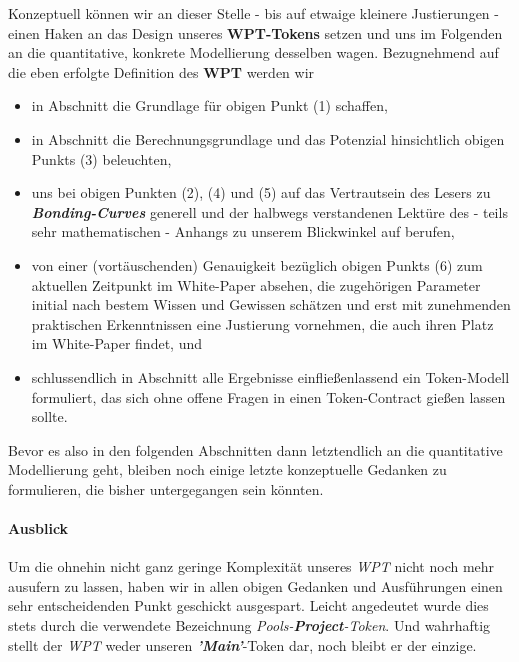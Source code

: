 \vspace{0.5cm}

Konzeptuell können wir an dieser Stelle - bis auf etwaige kleinere Justierungen - einen Haken an das Design unseres \textbf{WPT-Tokens} setzen und uns im Folgenden an die quantitative, konkrete Modellierung desselben wagen. Bezugnehmend auf die eben erfolgte Definition des \textbf{WPT} werden wir

\begin{itemize}
	\item in Abschnitt  die Grundlage für obigen Punkt (1) schaffen,
	\item in Abschnitt  die Berechnungsgrundlage und das Potenzial hinsichtlich obigen Punkts (3) beleuchten,
	\item uns bei obigen Punkten (2), (4) und (5) auf das Vertrautsein des Lesers zu \textbf{\textit{Bonding-Curves}} generell und der halbwegs verstandenen Lektüre des - teils sehr mathematischen - Anhangs zu unserem Blickwinkel auf  berufen,
	\item von einer (vortäuschenden) Genauigkeit bezüglich obigen Punkts (6) zum aktuellen Zeitpunkt im White-Paper absehen, die zugehörigen Parameter initial nach bestem Wissen und Gewissen schätzen und erst mit zunehmenden praktischen Erkenntnissen eine Justierung vornehmen, die auch ihren Platz im White-Paper findet, und
	\item schlussendlich in Abschnitt  alle Ergebnisse einfließenlassend ein Token-Modell formuliert, das sich ohne offene Fragen in einen Token-Contract gießen lassen sollte. 
\end{itemize}

\vspace{0.3cm}

Bevor es also in den folgenden Abschnitten dann letztendlich an die quantitative Modellierung geht, bleiben noch einige letzte konzeptuelle Gedanken zu formulieren, die bisher untergegangen sein könnten.

\vspace{0.5cm}


\paragraph{Ausblick}
\textbf{ }
\vspace{0.3cm}

Um die ohnehin nicht ganz geringe Komplexität unseres \textit{WPT} nicht noch mehr ausufern zu lassen, haben wir in allen obigen Gedanken und Ausführungen einen sehr entscheidenden Punkt geschickt ausgespart. Leicht angedeutet wurde dies stets durch die verwendete Bezeichnung \textit{Pools-\textbf{Project}-Token}. Und wahrhaftig stellt der \textit{WPT} weder unseren \textbf{\textit{'Main'}}-Token dar, noch bleibt er der einzige.

